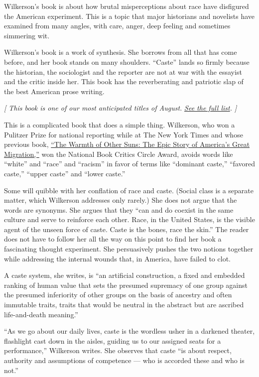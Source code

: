 Wilkerson's book is about how brutal misperceptions about race have
disfigured the American experiment. This is a topic that major
historians and novelists have examined from many angles, with care,
anger, deep feeling and sometimes simmering wit.

Wilkerson's book is a work of synthesis. She borrows from all that has
come before, and her book stands on many shoulders. ``Caste'' lands so
firmly because the historian, the sociologist and the reporter are not
at war with the essayist and the critic inside her. This book has the
reverberating and patriotic slap of the best American prose writing.

\emph{{[} This book is one of our most anticipated titles of August.}
\href{https://www.nytimes.com/2020/07/30/books/new-august-books.html}{\emph{See
the full list}}\emph{. {]}}

This is a complicated book that does a simple thing. Wilkerson, who won
a Pulitzer Prize for national reporting while at The New York Times and
whose previous book,
\href{https://www.nytimes.com/2010/09/05/books/review/Oshinsky-t.html}{``The
Warmth of Other Suns: The Epic Story of America's Great Migration,''}
won the National Book Critics Circle Award, avoids words like ``white''
and ``race'' and ``racism'' in favor of terms like ``dominant caste,''
``favored caste,'' ``upper caste'' and ``lower caste.''

Some will quibble with her conflation of race and caste. (Social class
is a separate matter, which Wilkerson addresses only rarely.) She does
not argue that the words are synonyms. She argues that they ``can and do
coexist in the same culture and serve to reinforce each other. Race, in
the United States, is the visible agent of the unseen force of caste.
Caste is the bones, race the skin.'' The reader does not have to follow
her all the way on this point to find her book a fascinating thought
experiment. She persuasively pushes the two notions together while
addressing the internal wounds that, in America, have failed to clot.

A caste system, she writes, is ``an artificial construction, a fixed and
embedded ranking of human value that sets the presumed supremacy of one
group against the presumed inferiority of other groups on the basis of
ancestry and often immutable traits, traits that would be neutral in the
abstract but are ascribed life-and-death meaning.''

``As we go about our daily lives, caste is the wordless usher in a
darkened theater, flashlight cast down in the aisles, guiding us to our
assigned seats for a performance,'' Wilkerson writes. She observes that
caste ``is about respect, authority and assumptions of competence ---
who is accorded these and who is not.''

